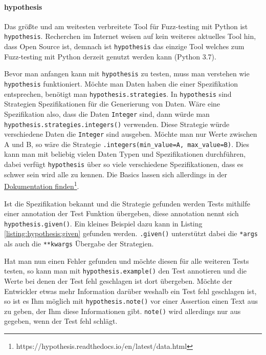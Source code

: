 \paragraph{hypothesis}\label{python-tools:hypothesis}\mbox{}
\newline
Das größte und am weitesten verbreitete Tool für Fuzz-testing mit Python ist
\lstinline{hypothesis}. Recherchen im Internet weisen auf kein weiteres aktuelles
Tool hin, dass Open Source ist, demnach ist \lstinline{hypothesis} das einzige
Tool welches zum Fuzz-testing mit Python derzeit genutzt werden kann (Python 3.7).

Bevor man anfangen kann mit \lstinline{hypothesis} zu testen, muss man verstehen
wie \lstinline{hypothesis} funktioniert. Möchte man Daten haben die einer
Spezifikation entsprechen, benötigt man \lstinline{hypothesis.strategies}. In
\lstinline{hypothesis} sind Strategien Spezifikationen für die Generierung von
Daten. Wäre eine Spezifikation also, dass die Daten \lstinline{Integer} sind, dann
würde man \lstinline{hypothesis.strategies.integers()} verwenden. Diese Strategie
würde verschiedene Daten die \lstinline{Integer} sind ausgeben. Möchte man nur
Werte zwischen A und B, so wäre die Strategie
\lstinline{.integers(min_value=A, max_value=B)}. Dies kann man mit beliebig
vielen Daten Typen und Spezifikationen durchführen, dabei verfügt
\lstinline{hypothesis} über so viele verschiedene Spezifikationen, dass es schwer
sein wird alle zu kennen. Die Basics lassen sich allerdings in der
\href{https://hypothesis.readthedocs.io/en/latest/data.html}{Dokumentation finden}\footnote{https://hypothesis.readthedocs.io/en/latest/data.html}.

Ist die Spezifikation bekannt und die Strategie gefunden werden Tests mithilfe einer
\Gls{annotation} der Test Funktion übergeben, diese \Gls{annotation} nennt sich
\lstinline{hypothesis.given()}. Ein kleines Beispiel dazu kann in Listing
\ref{listing:hypothesis:given} gefunden werden. \lstinline{.given()} unterstützt
dabei die \lstinline{*args} als auch die \lstinline{**kwargs} Übergabe der Strategien.

Hat man nun einen Fehler gefunden und möchte diesen für alle weiteren Tests testen,
so kann man mit \lstinline{hypothesis.example()} den Test annotieren und die Werte
bei denen der Test fehl geschlagen ist dort übergeben. Möchte der Entwickler etwas
mehr Information darüber weshalb ein Test fehl geschlagen ist, so ist es Ihm möglich
mit \lstinline{hypothesis.note()} vor einer Assertion einen Text aus zu geben, der
Ihm diese Informationen gibt. \lstinline{note()} wird allerdings nur aus gegeben,
wenn der Test fehl schlägt.

